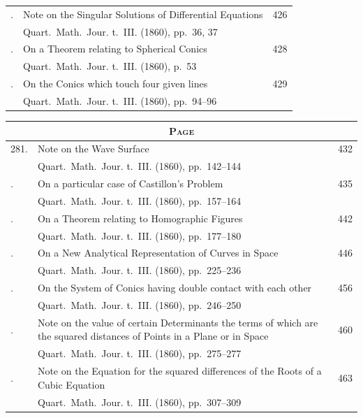 \documentclass[11pt,a4paper]{book}
\theoremstyle{plain}
\begin{document}
\begin{longtable}{p{0.5in}p{3.8in}p{0.4in}}
\addlinespace
278. & Note on the Singular Solutions of Differential Equations \dotfill & 426 \\
& \quad Quart.\ Math.\ Jour. t.~III. (1860), pp.~36, 37 & \\
\addlinespace
279. & On a Theorem relating to Spherical Conics \dotfill & 428 \\
& \quad Quart.\ Math.\ Jour. t.~III. (1860), p.~53 & \\
\addlinespace
280. & On the Conics which touch four given lines \dotfill & 429 \\
& \quad Quart.\ Math.\ Jour. t.~III. (1860), pp.~94--96 & \\
\end{longtable}
\newpage

\thispagestyle{empty}
\begin{longtable}{p{0.5in}p{3.8in}p{0.4in}}
\multicolumn{3}{c}{\textsc{Page}} \\
\midrule
\endhead
281. & Note on the Wave Surface \dotfill & 432 \\
& \quad Quart.\ Math.\ Jour. t.~III. (1860), pp.~142--144 & \\
\addlinespace
282. & On a particular case of Castillon's Problem \dotfill & 435 \\
& \quad Quart.\ Math.\ Jour. t.~III. (1860), pp.~157--164 & \\
\addlinespace
283. & On a Theorem relating to Homographic Figures \dotfill & 442 \\
& \quad Quart.\ Math.\ Jour. t.~III. (1860), pp.~177--180 & \\
\addlinespace
284. & On a New Analytical Representation of Curves in Space \dotfill & 446 \\
& \quad Quart.\ Math.\ Jour. t.~III. (1860), pp.~225--236 & \\
\addlinespace
285. & On the System of Conics having double contact with each other \dotfill & 456 \\
& \quad Quart.\ Math.\ Jour. t.~III. (1860), pp.~246--250 & \\
\addlinespace
286. & Note on the value of certain Determinants the terms of which are the squared distances of Points in a Plane or in Space \dotfill & 460 \\
& \quad Quart.\ Math.\ Jour. t.~III. (1860), pp.~275--277 & \\
\addlinespace
287. & Note on the Equation for the squared differences of the Roots of a Cubic Equation \dotfill & 463 \\
& \quad Quart.\ Math.\ Jour. t.~III. (1860), pp.~307--309 & \\

\end{longtable}
\end{document}
